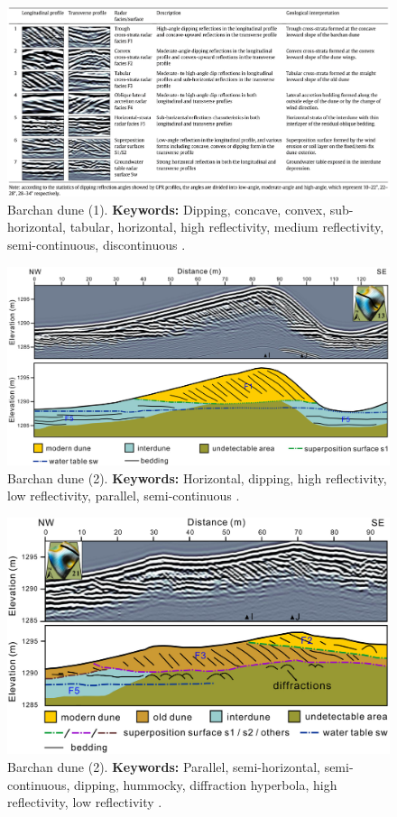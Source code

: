 \clearpage
\begin{landscape}
    \begin{figure}[h!]
    \centering
    \includegraphics[width=0.8\linewidth]{Figures/0.2GPR/Fu_2019_dunes_1.png}
    \caption[Barchan dune (1).]{Barchan dune (1). \textbf{Keywords: } Dipping, concave, convex, sub-horizontal, tabular, horizontal, high reflectivity, medium reflectivity, semi-continuous, discontinuous \citep{Fu2024}.}
    \label{fig:Fu2019-1}
\end{figure}
\end{landscape}

\begin{figure}[h!]
    \centering
    \includegraphics[width=0.9\linewidth]{Figures/0.2GPR/Fu_2019_dunes_2.png}
    \caption[Barchan dune (2).]{Barchan dune (2). \textbf{Keywords: } Horizontal, dipping, high reflectivity, low reflectivity, parallel, semi-continuous \citep{Fu2024}.}
    \label{fig:Fu2019-2}
\end{figure}

\begin{figure}[h!]
    \centering
    \includegraphics[width=0.9\linewidth]{Figures/0.2GPR/Fu_2019_dunes_4.png}
    \caption[Barchan dune (2).]{Barchan dune (2). \textbf{Keywords: } Parallel, semi-horizontal, semi-continuous, dipping, hummocky, diffraction hyperbola, high reflectivity, low reflectivity \citep{Fu2024}.}
    \label{fig:Fu2019-4}
\end{figure}

